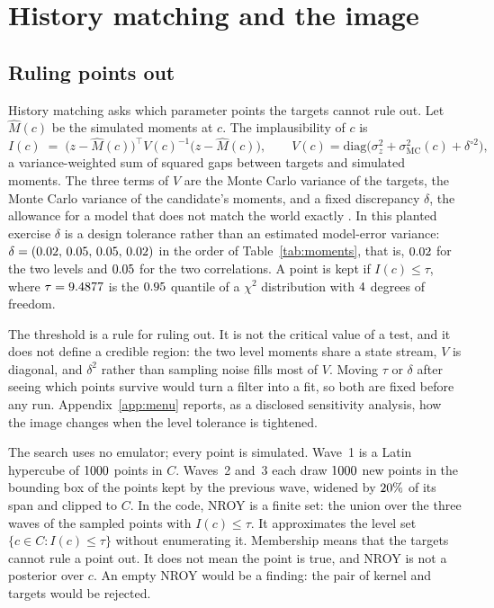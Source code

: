 \section{History matching and the image}\label{sec:hm}

\subsection{Ruling points out}

History matching asks which parameter points the targets cannot rule out. Let
$\widehat M(c)$ be the simulated moments at $c$. The implausibility of $c$ is
\begin{equation}\label{eq:implaus}
  I(c)
  \;=\;
  \bigl(z-\widehat M(c)\bigr)^{\!\top}
  V(c)^{-1}
  \bigl(z-\widehat M(c)\bigr),
  \qquad
  V(c)=\mathrm{diag}\bigl(\sigma^2_z+\sigma^2_{\mathrm{MC}}(c)+\delta^{\circ 2}\bigr),
\end{equation}
a variance-weighted sum of squared gaps between targets and simulated moments.
The three terms of $V$ are the Monte Carlo variance of the targets, the Monte
Carlo variance of the candidate's moments, and a fixed discrepancy $\delta$, the
allowance for a model that does not match the world exactly
\citep{kennedy2001,vernon2010}. In this planted exercise $\delta$ is a design
tolerance rather than an estimated model-error variance:
$\delta=(0.02,\,0.05,\,0.05,\,0.02)$ in the order of
Table~\ref{tab:moments}, that is, $0.02$ for the two levels and $0.05$
for the two correlations. A point is kept if $I(c)\le\tau$, where $\tau=9.4877$ is
the $0.95$ quantile of a $\chi^2$ distribution with $4$ degrees of
freedom.

The threshold is a rule for ruling out. It is not the critical value of a test,
and it does not define a credible region: the two level moments share a state
stream, $V$ is diagonal, and $\delta^2$ rather than sampling noise fills most of
$V$. Moving $\tau$ or $\delta$ after seeing which points survive would turn a
filter into a fit, so both are fixed before any run. Appendix~\ref{app:menu}
reports, as a disclosed sensitivity analysis, how the image changes when the level
tolerance is tightened.

The search uses no emulator; every point is simulated. Wave~1 is a Latin
hypercube of $1000$ points in $C$. Waves~2 and~3 each draw $1000$
new points in the bounding box of the points kept by the previous wave, widened
by $20\%$ of its span and clipped to $C$. In the code, NROY is a
finite set: the union over the three waves of the sampled points with
$I(c)\le\tau$. It approximates the level set $\{c\in C:I(c)\le\tau\}$ without
enumerating it. Membership means that the targets cannot rule a point out. It
does not mean the point is true, and NROY is not a posterior over $c$. An empty
NROY would be a finding: the pair of kernel and targets would be rejected.


